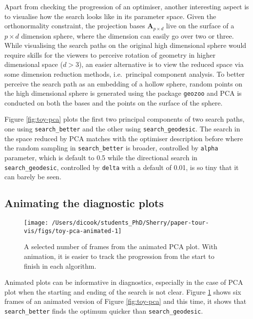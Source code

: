 \documentclass[12pt]{article}
\begin{document}
Apart from checking the progression of an optimiser, another interesting aspect is to visualise how the search looks like in its parameter space. Given the orthonormality constraint, the projection bases \(\mathbf{A}_{p \times d}\) live on the surface of a \(p \times d\) dimension sphere, where the dimension can easily go over two or three. While visualising the search paths on the original high dimensional sphere would require skills for the viewers to perceive rotation of geometry in higher dimensional space (\(d > 3\)), an easier alternative is to view the reduced space via some dimension reduction methods, i.e.~principal component analysis. To better perceive the search path as an embedding of a hollow sphere, random points on the high dimensional sphere is generated using the package \texttt{geozoo} and PCA is conducted on both the bases and the points on the surface of the sphere.

Figure \ref{fig:toy-pca} plots the first two principal components of two search paths, one using \texttt{search\_better} and the other using \texttt{search\_geodesic}. The search in the space reduced by PCA matches with the optimiser description before where the random sampling in \texttt{search\_better} is broader, controlled by \texttt{alpha} parameter, which is default to 0.5 while the directional search in \texttt{search\_geodesic}, controlled by \texttt{delta} with a default of 0.01, is so tiny that it can barely be seen.

\hypertarget{animating-the-diagnostic-plots}{%
\subsection{Animating the diagnostic plots}\label{animating-the-diagnostic-plots}}

\begin{figure}

{\centering \texttt{[image: /Users/dicook/students\_PhD/Sherry/paper-tour-vis/figs/toy-pca-animated-1]} 

}

\caption{A selected number of frames from the animated PCA plot. With animation, it is easier to track the progression from the start to finish in each algorithm.}\label{fig:toy-pca-animated}
\end{figure}



Animated plots can be informative in diagnostics, especially in the case of PCA plot when the starting and ending of the search is not clear. Figure \ref{fig:toy-pca-animated} shows six frames of an animated version of Figure \ref{fig:toy-pca} and this time, it shows that \texttt{search\_better} finds the optimum quicker than \texttt{search\_geodesic}.
\end{document}
